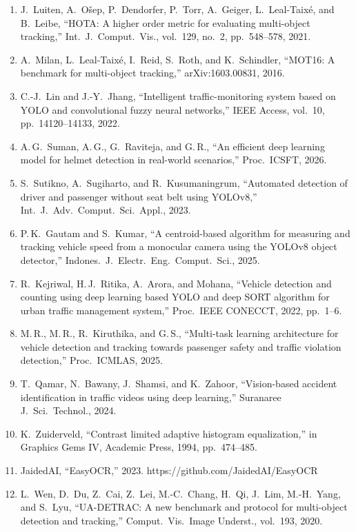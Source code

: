 \documentclass[10pt,a4paper,twocolumn]{article}
\begin{document}
{\begin{enumerate}[leftmargin=1.6em,label={\arabic*.},itemsep=0pt]
\item J.\ Luiten, A.\ O\v{s}ep, P.\ Dendorfer, P.\ Torr, A.\ Geiger, L.\ Leal-Taix\'e, and B.\ Leibe, ``HOTA: A higher order metric for evaluating multi-object tracking,'' Int.\ J.\ Comput.\ Vis., vol.\ 129, no.\ 2, pp.\ 548--578, 2021.
\item A.\ Milan, L.\ Leal-Taix\'e, I.\ Reid, S.\ Roth, and K.\ Schindler, ``MOT16: A benchmark for multi-object tracking,'' arXiv:1603.00831, 2016.
\item C.-J.\ Lin and J.-Y.\ Jhang, ``Intelligent traffic-monitoring system based on YOLO and convolutional fuzzy neural networks,'' IEEE Access, vol.\ 10, pp.\ 14120--14133, 2022.
\item A.\,G.\ Suman, A.\,G., G.\ Raviteja, and G.\,R., ``An efficient deep learning model for helmet detection in real-world scenarios,'' Proc.\ ICSFT, 2026.
\item S.\ Sutikno, A.\ Sugiharto, and R.\ Kusumaningrum, ``Automated detection of driver and passenger without seat belt using YOLOv8,'' Int.\ J.\ Adv.\ Comput.\ Sci.\ Appl., 2023.
\item P.\,K.\ Gautam and S.\ Kumar, ``A centroid-based algorithm for measuring and tracking vehicle speed from a monocular camera using the YOLOv8 object detector,'' Indones.\ J.\ Electr.\ Eng.\ Comput.\ Sci., 2025.
\item R.\ Kejriwal, H.\,J.\ Ritika, A.\ Arora, and Mohana, ``Vehicle detection and counting using deep learning based YOLO and deep SORT algorithm for urban traffic management system,'' Proc.\ IEEE CONECCT, 2022, pp.\ 1--6.
\item M.\,R., M.\,R., R.\ Kiruthika, and G.\,S., ``Multi-task learning architecture for vehicle detection and tracking towards passenger safety and traffic violation detection,'' Proc.\ ICMLAS, 2025.
\item T.\ Qamar, N.\ Bawany, J.\ Shamsi, and K.\ Zahoor, ``Vision-based accident identification in traffic videos using deep learning,'' Suranaree J.\ Sci.\ Technol., 2024.
\item K.\ Zuiderveld, ``Contrast limited adaptive histogram equalization,'' in Graphics Gems IV, Academic Press, 1994, pp.\ 474--485.
\item JaidedAI, ``EasyOCR,'' 2023. https://github.com/JaidedAI/EasyOCR
\item L.\ Wen, D.\ Du, Z.\ Cai, Z.\ Lei, M.-C.\ Chang, H.\ Qi, J.\ Lim, M.-H.\ Yang, and S.\ Lyu, ``UA-DETRAC: A new benchmark and protocol for multi-object detection and tracking,'' Comput.\ Vis.\ Image Underst., vol.\ 193, 2020.

\end{enumerate}}
\end{document}

